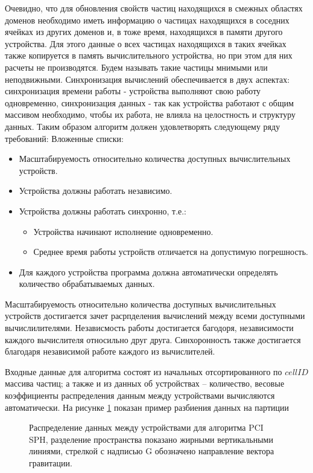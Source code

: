 Очевидно, что для обновления свойств частиц находящихся в смежных областях доменов необходимо иметь информацию о частицах находящихся в соседних ячейках из других доменов и, в тоже время, находящихся в памяти другого устройства. Для этого данные о всех частицах находящихся в таких ячейках также копируется в память вычислительного устройства, но при этом для них расчеты не производятся. Будем называть такие частицы мнимыми или неподвижными.
Синхронизация вычислений обеспечивается в двух аспектах: синхронизация времени работы - устройства выполняют свою работу одновременно, синхронизация данных - так как устройства работают с общим массивом необходимо, чтобы их работа, не влияла на целостность и структуру данных. Таким образом алгоритм должен удовлетворять следующему ряду требований:
\noindent Вложенные списки:
\begin{itemize}
  \item Масштабируемость относительно количества доступных вычислительных устройств.
  \item Устройства должны работать независимо.
  \item Устройства должны работать синхронно, т.е.:
        \begin{itemize}
          \item Устройства начинают исполнение  одновременно.
          \item Среднее время работы устройств отличается на допустимую погрешность.
        \end{itemize}
  \item Для каждого устройства программа должна автоматически определять количество обрабатываемых данных.
\end{itemize}
Масштабируемость относительно количества доступных вычислительных устройств достигается зачет расрпделения вычислений между всеми доступными вычислилителями. Независмость работы достигается багодоря, независимости каждого вычислителя относильно друг друга. Синхоронность также достигается благодаря независимой работе каждого из вычислителей.

Входные данные для алгоритма состоят из начальных отсортированного по  \(cellID\) массива частиц; а также и из данных об устройствах – количество, весовые коэффициенты распределения данным между устройствами вычисляются автоматически. На рисунке \ref{fig:dstr_2} показан пример разбиения данных на партиции
\begin{figure}[ht]
  \caption{Распределение данных между устройствами для алгоритма PCI SPH, разделение пространства показано жирными вертикальными линиями, стрелкой с надписью G обозначено направление вектора гравитации.}
  \label{fig:dstr_2}
\end{figure}

